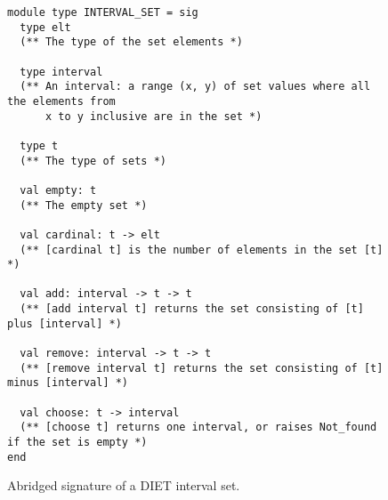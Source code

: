 \begin{figure}[ht]
  \caption{Abridged signature of a DIET interval set.}
  \label{lst:diet-sig}

  \centering
  \vspace{-1em}
  \begin{verbatim}
module type INTERVAL_SET = sig
  type elt
  (** The type of the set elements *)

  type interval
  (** An interval: a range (x, y) of set values where all the elements from
      x to y inclusive are in the set *)

  type t
  (** The type of sets *)

  val empty: t
  (** The empty set *)

  val cardinal: t -> elt
  (** [cardinal t] is the number of elements in the set [t] *)

  val add: interval -> t -> t
  (** [add interval t] returns the set consisting of [t] plus [interval] *)

  val remove: interval -> t -> t
  (** [remove interval t] returns the set consisting of [t] minus [interval] *)

  val choose: t -> interval
  (** [choose t] returns one interval, or raises Not_found if the set is empty *)
end
    \end{verbatim}
\end{figure}
